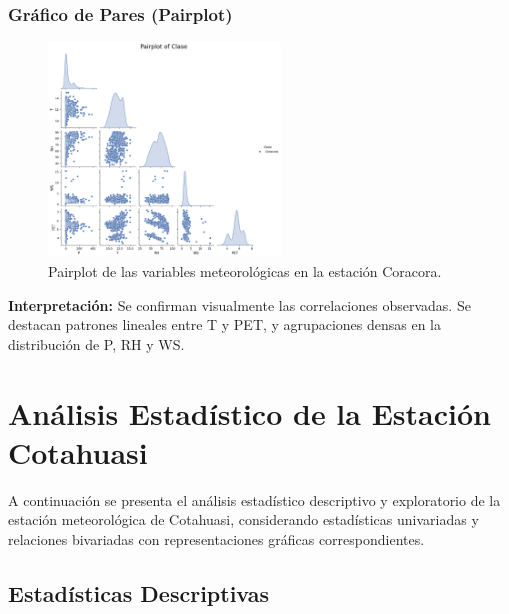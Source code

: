 \subsubsection*{Gráfico de Pares (Pairplot)}
\begin{figure}[H]
\centering
\includegraphics[width=0.55\textwidth]{resultados/por_estacion_meteorologica/Coracora/pairplot.png}
\caption{Pairplot de las variables meteorológicas en la estación Coracora.}
\label{fig:coracora_pairplot}
\end{figure}
\textbf{Interpretación:} Se confirman visualmente las correlaciones observadas. Se destacan patrones lineales entre T y PET, y agrupaciones densas en la distribución de P, RH y WS.





\section{Análisis Estadístico de la Estación Cotahuasi}

A continuación se presenta el análisis estadístico descriptivo y exploratorio de la estación meteorológica de Cotahuasi, considerando estadísticas univariadas y relaciones bivariadas con representaciones gráficas correspondientes.

\subsection{Estadísticas Descriptivas}

